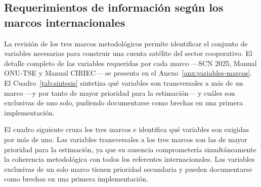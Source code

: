 \subsection{Requerimientos de información según los marcos internacionales}

La revisión de los tres marcos metodológicos permite identificar el conjunto 
de variables necesarias para construir una cuenta satélite del sector 
cooperativo. El detalle completo de las variables requeridas por cada marco 
---SCN 2025, Manual ONU-TSE y Manual CIRIEC--- se presenta en el 
Anexo~\ref{anx:variables-marcos}. El Cuadro~\ref{tab:sintesis} sintetiza 
qué variables son transversales a más de un marco ---y por tanto de mayor 
prioridad para la estimación--- y cuáles son exclusivas de uno solo, 
pudiendo documentarse como brechas en una primera implementación.

El cuadro siguiente cruza los tres marcos e identifica qué 
variables son exigidas por más de uno. Las variables 
transversales a los tres marcos son las de mayor prioridad 
para la estimación, ya que su ausencia comprometería 
simultáneamente la coherencia metodológica con todos los 
referentes internacionales. Las variables exclusivas de un 
solo marco tienen prioridad secundaria y pueden documentarse 
como brechas en una primera implementación.

